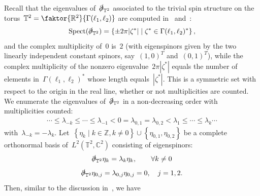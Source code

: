 \documentclass[10pt,a4paper]{amsart}
\newcommand{\R}{\mathbb{R}}
\newcommand{\C}{\mathbb{C}}
\newcommand{\T}{\mathbb{T}}
\newcommand{\pd}{\slashed{\partial}}
\newcommand{\braces}[1]{\left\{#1\right\}} %
\DeclareMathOperator{\Spect}{Spect}
\begin{document}
Recall that the eigenvalues of~$\pd_{\T^2}$ associated to the trivial spin structure on the torus~$\T^2=\faktor{\R^2}{\Gamma(\ell_1,\ell_2)}$ are computed in~\cite{Friedrich1984zur} and~\cite{Ginoux2009Dirac}:  
\begin{align}
    \Spect(\pd_{\T^2}) =
    \braces{ \pm 2\pi |\zeta^*| \mid \zeta^*\in\Gamma(\ell_1,\ell_2)^*},
\end{align}
and the complex multiplicity of~$0$ is~$2$ (with eigenspinors given by the two linearly independent constant spinors, say~$(1,0)^T$ and~$(0,1)^T$), while the complex multiplicity of the nonzero eigenvalue~$2\pi|\zeta^*|$ equals the number of elements in~$\Gamma(\ell_1,\ell_2)^*$ whose length equals~$|\zeta^*|$.
This is a symmetric set with respect to the origin in the real line, whether or not multiplicities are counted. 
We enumerate the eigenvalues of~$\pd_{\T^2}$ in a non-decreasing order with multiplicities counted: 
\begin{align}\label{eq:spectrum-pd}
        \cdots \leq \lambda_{-k}\leq  \cdots \leq \lambda_{-1} <0=\lambda_{0,1}=\lambda_{0,2}<\lambda_1\leq \cdots \leq \lambda_k \cdots  
    \end{align}
with~$\lambda_{-k}=-\lambda_k$. 
Let~$\braces{\eta_k\mid k\in\mathbb{Z},k\neq 0} \cup \braces{\eta_{0,1},\eta_{0,2}}$ be a complete orthonormal basis of~$L^2(\T^2,\C^2)$ consisting of eigenspinors:
\begin{align}
    \pd_{\T^2}\eta_k = \lambda_k \eta_k, \qquad \forall k\neq 0
\end{align}
\begin{align}
    \pd_{\T^2}\eta_{0,j}=\lambda_{0,j}\eta_{0,j}=0, \quad j=1,2. 
\end{align}
Then, similar to the discussion in~\cite{WZ2026Stationary}, we have 
\end{document}
